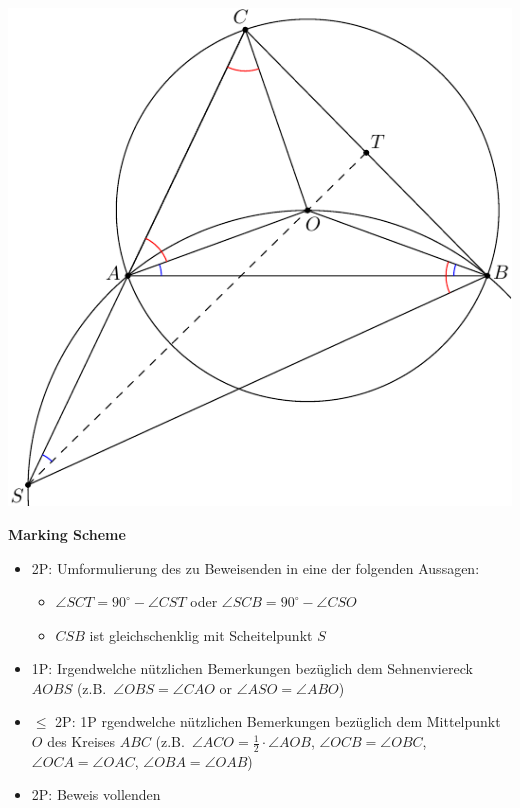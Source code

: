{\begin{center}
\includegraphics{g1fig.pdf}
\end{center}

\bigskip

\textbf{Marking Scheme}

\begin{itemize}
    \item 2P: Umformulierung des zu Beweisenden in eine der folgenden Aussagen:
    \begin{itemize}
    \item $\angle SCT=90^\circ-\angle CST$ oder $\angle SCB=90^\circ-\angle CSO$
    \item $CSB$ ist gleichschenklig mit Scheitelpunkt $S$
    \end{itemize}
    \item 1P: Irgendwelche nützlichen Bemerkungen bezüglich dem Sehnenviereck $AOBS$ (z.B.\ $\angle OBS=\angle CAO$ or $\angle ASO=\angle ABO$)
    \item $\leq$ 2P: 1P rgendwelche nützlichen Bemerkungen bezüglich dem Mittelpunkt $O$ des Kreises $ABC$ (z.B.\ $\angle ACO=\frac{1}{2}\cdot \angle AOB$, $\angle OCB=\angle OBC$, $\angle OCA=\angle OAC$, $\angle OBA=\angle OAB$) 
    \item 2P: Beweis vollenden
\end{itemize}
}


